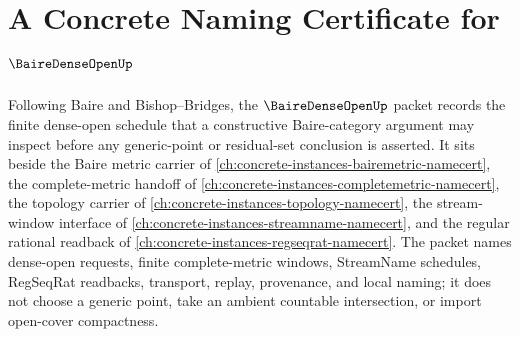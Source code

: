 \chapter{A Concrete Naming Certificate for $\BaireDenseOpenUp$}
\label{ch:concrete-instances-baire-dense-open-namecert}

Following Baire and Bishop--Bridges, the $\BaireDenseOpenUp$ packet records the finite dense-open schedule that a constructive Baire-category argument may inspect before any generic-point or residual-set conclusion is asserted. It sits beside the Baire metric carrier of \autoref{ch:concrete-instances-bairemetric-namecert}, the complete-metric handoff of \autoref{ch:concrete-instances-completemetric-namecert}, the topology carrier of \autoref{ch:concrete-instances-topology-namecert}, the stream-window interface of \autoref{ch:concrete-instances-streamname-namecert}, and the regular rational readback of \autoref{ch:concrete-instances-regseqrat-namecert}. The packet names dense-open requests, finite complete-metric windows, StreamName schedules, RegSeqRat readbacks, transport, replay, provenance, and local naming; it does not choose a generic point, take an ambient countable intersection, or import open-cover compactness.

